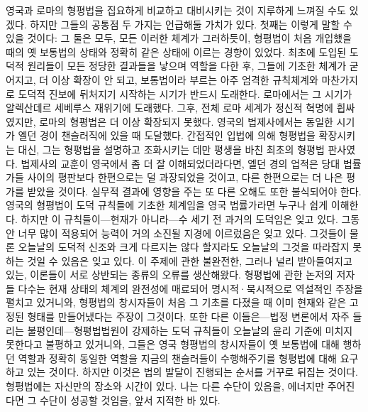 영국과 로마의 형평법을 집요하게 비교하고 대비시키는 것이 지루하게 느껴질 수도
있겠다. 하지만 그들의 공통점 두 가지는 언급해둘 가치가 있다.
첫째는 이렇게 말할 수 있을 것이다:
그 둘은 모두, 모든 이러한 체계가 그러하듯이,
형평법이 처음 개입했을 때의 옛 보통법의 상태와 정확히 같은 상태에
이르는 경향이 있었다.
최초에 도입된 도덕적 원리들이 모든 정당한 결과들을 낳으며 역할을 다한 후,
그들에 기초한 체계가 굳어지고, 더 이상 확장이 안 되고,
보통법이라 부르는 아주 엄격한 규칙체계와 마찬가지로
도덕적 진보에 뒤처지기 시작하는
시기가 반드시 도래한다.
로마에서는 그 시기가 알렉산데르 세베루스 재위기에 도래했다.
그후, 전체 로마 세계가 정신적 혁명에 휩싸였지만, 로마의 형평법은
더 이상 확장되지 못했다.
영국의 법제사에서는 동일한 시기가 엘던 경이
챈슬러직에 있을 때 도달했다.
간접적인 입법에 의해 형평법을 확장시키는 대신, 그는
형평법을 설명하고 조화시키는 데만 평생을 바친 최초의 형평법 판사였다.
법제사의 교훈이 영국에서 좀 더 잘 이해되었더라다면,
엘던 경의 업적은
당대 법률가들 사이의 평판보다
한편으로는 덜 과장되었을 것이고,
다른 한편으로는 더 나은 평가를 받았을 것이다.
실무적 결과에 영향을 주는 또 다른 오해도 또한 불식되어야 한다.
영국의 형평법이 도덕 규칙들에 기초한 체계임을
영국 법률가라면 누구나 쉽게 이해한다.
하지만 이 규칙들이---현재가 아니라---수 세기 전 과거의 도덕임은 잊고 있다.
그동안 너무 많이 적용되어 능력이 거의 소진될 지경에 이르렀음은 잊고 있다.
그것들이 물론 오늘날의 도덕적 신조와 크게 다르지는 않다 할지라도
오늘날의 그것을 따라잡지 못하는 것일 수 있음은 잊고 있다.
이 주제에 관한 불완전한, 그러나 널리 받아들여지고 있는, 이론들이
서로 상반되는 종류의 오류를 생산해왔다.
형평법에 관한 논저의 저자들 다수는
현재 상태의 체계의 완전성에 매료되어
명시적^^b7묵시적으로 역설적인 주장을 펼치고 있거니와,
형평법의 창시자들이 처음 그 기초를 다졌을 때 이미 현재와 같은 고정된 형태를
만들어냈다는 주장이 그것이다.
또한 다른 이들은---법정 변론에서 자주 들리는 불평인데---형평법법원이
강제하는 도덕 규칙들이 오늘날의 윤리 기준에 미치지 못한다고 불평하고 있거니와,
그들은 영국 형평법의 창시자들이 옛 보통법에 대해
행하던 역할과 정확히 동일한 역할을
지금의 챈슬러들이
수행해주기를 형평법에 대해 요구하고 있는 것이다.
하지만 이것은 법의 발달이 진행되는 순서를 거꾸로 뒤집는 것이다.
형평법에는 자신만의 장소와 시간이 있다.
나는 다른 수단이 있음을, 에너지만 주어진다면 그 수단이 성공할 것임을,
앞서 지적한 바 있다.

